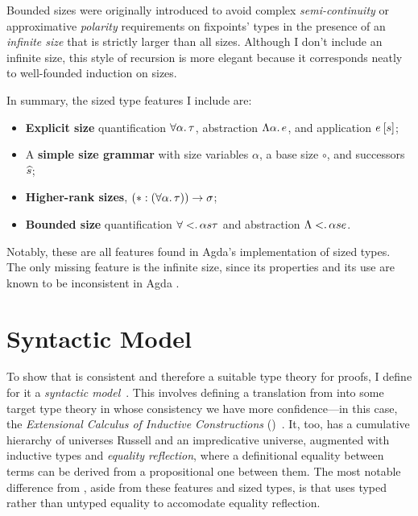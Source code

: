 Bounded sizes were originally introduced to avoid complex
\emph{semi-continuity} or approximative \emph{polarity}
requirements on fixpoints' types in the presence of an \emph{infinite size}
that is strictly larger than all sizes.
Although I don't include an infinite size,
this style of recursion is more elegant because it corresponds neatly to well-founded induction on sizes.

In summary, the sized type features I include are:

\begin{itemize}[noitemsep]
  \item \textbf{Explicit size} quantification $\forall \alpha \mathpunct{.} \tau$,
    abstraction $\Lambda \alpha \mathpunct{.} e$, and
    application $\App{e}{s}$;
  \item A \textbf{simple size grammar} with size variables $\alpha$, a base size $\circ$, and successors $\widehat{s}$;
  \item \textbf{Higher-rank sizes}, \eg $\arr*{(\Funtype{\alpha}{\tau})}{\sigma}$;
  \item \textbf{Bounded size} quantification $\forall < \mathpunct{.} \alpha{s}{\tau}$ and
  abstraction $\Lambda < \mathpunct{.} \alpha{s}{e}$.
\end{itemize}

Notably, these are all features found in Agda's implementation of sized types.
The only missing feature is the infinite size,
since its properties and its use are known to be inconsistent in Agda%
\textsuperscript{}.

\section{Syntactic Model}\label{sec:syntactic-model}

To show that \lang is consistent and therefore a suitable type theory for proofs,
I define for it a \emph{syntactic model}~\citep{syntactic-models}.
This involves defining a translation from \lang into some target type theory
in whose consistency we have more confidence---in this case,
the \emph{Extensional Calculus of Inductive Constructions}
(\CICE)~\citep{CICE}.
It, too, has a cumulative hierarchy of universes \ala Russell and an impredicative universe,
augmented with inductive types and \emph{equality reflection},
where a definitional equality between terms can be derived from a propositional one between them.
The most notable difference from \lang, aside from these features and sized types,
is that \CICE uses typed rather than untyped equality to accomodate equality reflection.

